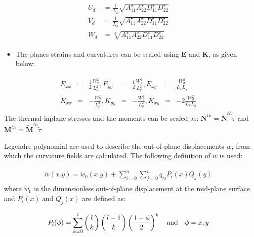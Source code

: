 \documentclass[journal]{new-aiaa}
\begin{document}
\begin{eqnarray}
\begin{aligned}
U_d&= \frac{1}{L_x}\sqrt{A_{11}^\star A_{22}^\star D_{11}^\star D_{22}^\star}\\
V_d&= \frac{1}{L_y}\sqrt{A_{11}^\star A_{22}^\star D_{11}^\star D_{22}^\star}\\
W_d&= \sqrt[4]{A_{11}^\star A_{22}^\star D_{11}^\star D_{22}^\star}
\end{aligned}
\end{eqnarray}
\begin{itemize}
	\item  The planes strains and curvatures can be scaled using $\textbf{E}$ and $\textbf{K}$, as given below: 
\end{itemize}

\begin{eqnarray}
\begin{aligned}
E_{xx}&=&\frac{1}{2}\frac{W_d^2}{L_x^2},
E_{yy}&=&\frac{1}{2}\frac{W_d^2}{L_y^2},
E_{xy}&=&\frac{W_d^2}{L_xL_y} \\
K_{xx}&=&-\frac{W_d^2}{L_x^2},
K_{yy}&=&-\frac{W_d^2}{L_y^2},
K_{xy}&=&-2\frac{W_d^2}{L_xL_y} 
\end{aligned}
\end{eqnarray}
The thermal inplane-stresses and the moments can be scaled as:
$\bm{N}^{th}=\bm{\tilde{N}}^{th} \tilde{\tau}$ and $\bm{M}^{th}=\bm{\tilde{M}}^{th} \tilde{\tau}$ 

Legendre polynomial are used to describe the out-of-plane displacements $w$, from which the curvature  fields are calculated. The following definition of $w$ is used:

\begin{eqnarray}
\begin{aligned}
\tilde{w}(x.y)= \tilde{w}_0(x.y) +  \sum_{i=0}^{n} \sum_{j=0}^{n} q_{ij}P_i(x)Q_j(y)
\end{aligned}
\label{eqn:wdef}
\end{eqnarray}
where $\tilde{w}_0$ is the dimensionless out-of-plane displacement at the mid-plane surface and $P_i(x)$ and $Q_j(x)$ are defined as:

\begin{eqnarray}
\begin{aligned}
P_l(\phi)=\sum_{k=0}^{l}\left( {l \atop k} \right)\left( {l-1 \atop k} \right)\left(\dfrac{1-\phi}{2}\right)^k   \quad  \text{and} \quad \phi=x,y
\label{eqn:wdef}
\end{aligned}
\end{eqnarray}
\end{document}
